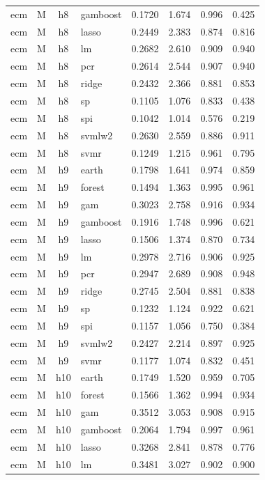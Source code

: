 \begin{ThreePartTable}
\begin{longtable}[t]{llclcccc}
ecm & M & h8 & gamboost & 0.1720 & 1.674 & 0.996 & 0.425\\
ecm & M & h8 & lasso & 0.2449 & 2.383 & 0.874 & 0.816\\
ecm & M & h8 & lm & 0.2682 & 2.610 & 0.909 & 0.940\\
ecm & M & h8 & pcr & 0.2614 & 2.544 & 0.907 & 0.940\\
ecm & M & h8 & ridge & 0.2432 & 2.366 & 0.881 & 0.853\\
ecm & M & h8 & sp & 0.1105 & 1.076 & 0.833 & 0.438\\
ecm & M & h8 & spi & 0.1042 & 1.014 & 0.576 & 0.219\\
ecm & M & h8 & svmlw2 & 0.2630 & 2.559 & 0.886 & 0.911\\
ecm & M & h8 & svmr & 0.1249 & 1.215 & 0.961 & 0.795\\
\addlinespace
ecm & M & h9 & earth & 0.1798 & 1.641 & 0.974 & 0.859\\
ecm & M & h9 & forest & 0.1494 & 1.363 & 0.995 & 0.961\\
ecm & M & h9 & gam & 0.3023 & 2.758 & 0.916 & 0.934\\
ecm & M & h9 & gamboost & 0.1916 & 1.748 & 0.996 & 0.621\\
ecm & M & h9 & lasso & 0.1506 & 1.374 & 0.870 & 0.734\\
ecm & M & h9 & lm & 0.2978 & 2.716 & 0.906 & 0.925\\
ecm & M & h9 & pcr & 0.2947 & 2.689 & 0.908 & 0.948\\
ecm & M & h9 & ridge & 0.2745 & 2.504 & 0.881 & 0.838\\
ecm & M & h9 & sp & 0.1232 & 1.124 & 0.922 & 0.621\\
ecm & M & h9 & spi & 0.1157 & 1.056 & 0.750 & 0.384\\
ecm & M & h9 & svmlw2 & 0.2427 & 2.214 & 0.897 & 0.925\\
ecm & M & h9 & svmr & 0.1177 & 1.074 & 0.832 & 0.451\\
\addlinespace
ecm & M & h10 & earth & 0.1749 & 1.520 & 0.959 & 0.705\\
ecm & M & h10 & forest & 0.1566 & 1.362 & 0.994 & 0.934\\
ecm & M & h10 & gam & 0.3512 & 3.053 & 0.908 & 0.915\\
ecm & M & h10 & gamboost & 0.2064 & 1.794 & 0.997 & 0.961\\
ecm & M & h10 & lasso & 0.3268 & 2.841 & 0.878 & 0.776\\
ecm & M & h10 & lm & 0.3481 & 3.027 & 0.902 & 0.900\\

\end{longtable}
\end{ThreePartTable}
